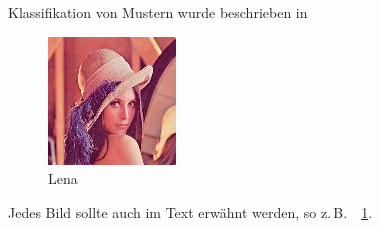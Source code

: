 Klassifikation von Mustern wurde beschrieben in \cite{Niemann2007KVM}

\begin{figure}[tb]
  \includegraphics[width=0.8\linewidth]{images/lena}
  \caption{Lena}\label{f:lena}
\end{figure}

Jedes Bild sollte auch im Text erwähnt werden, so z.\,B.\ \figurename~\ref{f:lena}.

